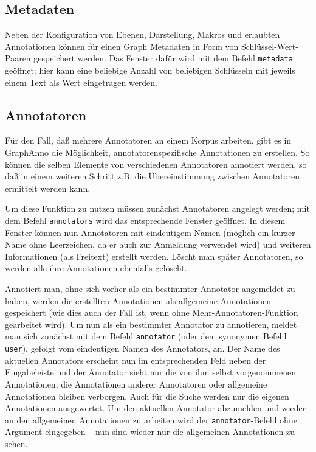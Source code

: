 \documentclass[12pt]{scrartcl}
\begin{document}
\subsection{Metadaten}

Neben der Konfiguration von Ebenen, Darstellung, Makros und erlaubten Annotationen können für einen Graph Metadaten in Form von Schlüssel-Wert-Paaren gespeichert werden. Das Fenster dafür wird mit dem Befehl \texttt{metadata} geöffnet; hier kann eine beliebige Anzahl von beliebigen Schlüsseln mit jeweils einem Text als Wert eingetragen werden.

\subsection{Annotatoren}\label{annotatoren}

Für den Fall, daß mehrere Annotatoren an einem Korpus arbeiten, gibt es in GraphAnno die Möglichkeit, annotatorenspezifische Annotationen zu erstellen.
So können die selben Elemente von verschiedenen Annotatoren annotiert werden, so daß in einem weiteren Schritt z.B. die Übereinstimmung zwischen Annotatoren ermittelt werden kann.

Um diese Funktion zu nutzen müssen zunächst Annotatoren angelegt werden; mit dem Befehl \texttt{annotators} wird das entsprechende Fenster geöffnet.
In diesem Fenster können nun Annotatoren mit eindeutigem Namen (möglich ein kurzer Name ohne Leerzeichen, da er auch zur Anmeldung verwendet wird) und weiteren Informationen (als Freitext) erstellt werden.
Löscht man später Annotatoren, so werden alle ihre Annotationen ebenfalls gelöscht.

Annotiert man, ohne sich vorher als ein bestimmter Annotator angemeldet zu haben, werden die erstellten Annotationen als allgemeine Annotationen gespeichert (wie dies auch der Fall ist, wenn ohne Mehr-Annotatoren-Funktion gearbeitet wird).
Um nun als ein bestimmter Annotator zu annotieren, meldet man sich zunächst mit dem Befehl \texttt{annotator} (oder dem synonymen Befehl \texttt{user}), gefolgt vom eindeutigen Namen des Annotators, an.
Der Name des aktuellen Annotators erscheint nun im entsprechenden Feld neben der Eingabeleiste und der Annotator sieht nur die von ihm selbst vorgenommenen Annotationen; die Annotationen anderer Annotatoren oder allgemeine Annotationen bleiben verborgen.
Auch für die Suche werden nur die eigenen Annotationen ausgewertet.
Um den aktuellen Annotator abzumelden und wieder an den allgemeinen Annotationen zu arbeiten wird der \texttt{annotator}-Befehl ohne Argument eingegeben – nun sind wieder nur die allgemeinen Annotationen zu sehen.
\end{document}
